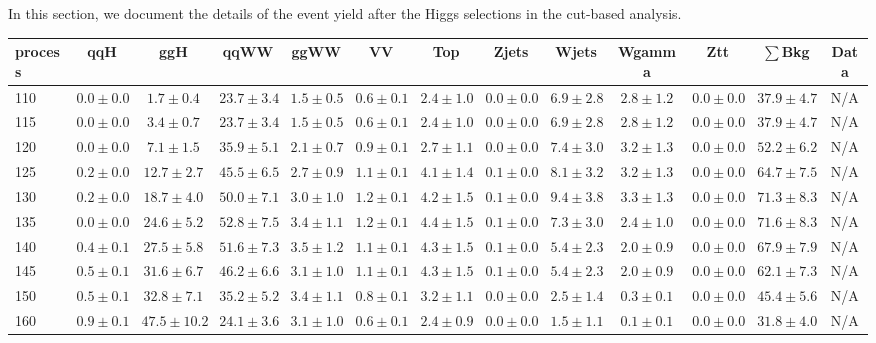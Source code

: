 In this section, we document the details of the event yield after the Higgs 
selections in the cut-based analysis.

\begin{table}
{%
 \tiny
 \begin{center}
 \begin{tabular}{l | c c | c c c c c c c c  | c c}
 \hline
 process & qqH & ggH & qqWW & ggWW & VV & Top & Zjets & Wjets & Wgamma & Ztt & $\sum$Bkg & Data \\
 \hline
110 & $0.0\pm0.0$ & $1.7\pm0.4$ & $23.7\pm3.4$ & $1.5\pm0.5$ & $0.6\pm0.1$ & $2.4\pm1.0$ & $0.0\pm0.0$ & $6.9\pm2.8$ & $2.8\pm1.2$ & $0.0\pm0.0$ & $37.9\pm4.7$ & N/A \\
115 & $0.0\pm0.0$ & $3.4\pm0.7$ & $23.7\pm3.4$ & $1.5\pm0.5$ & $0.6\pm0.1$ & $2.4\pm1.0$ & $0.0\pm0.0$ & $6.9\pm2.8$ & $2.8\pm1.2$ & $0.0\pm0.0$ & $37.9\pm4.7$ & N/A \\
120 & $0.0\pm0.0$ & $7.1\pm1.5$ & $35.9\pm5.1$ & $2.1\pm0.7$ & $0.9\pm0.1$ & $2.7\pm1.1$ & $0.0\pm0.0$ & $7.4\pm3.0$ & $3.2\pm1.3$ & $0.0\pm0.0$ & $52.2\pm6.2$ & N/A \\
125 & $0.2\pm0.0$ & $12.7\pm2.7$ & $45.5\pm6.5$ & $2.7\pm0.9$ & $1.1\pm0.1$ & $4.1\pm1.4$ & $0.1\pm0.0$ & $8.1\pm3.2$ & $3.2\pm1.3$ & $0.0\pm0.0$ & $64.7\pm7.5$ & N/A \\
130 & $0.2\pm0.0$ & $18.7\pm4.0$ & $50.0\pm7.1$ & $3.0\pm1.0$ & $1.2\pm0.1$ & $4.2\pm1.5$ & $0.1\pm0.0$ & $9.4\pm3.8$ & $3.3\pm1.3$ & $0.0\pm0.0$ & $71.3\pm8.3$ & N/A \\
135 & $0.0\pm0.0$ & $24.6\pm5.2$ & $52.8\pm7.5$ & $3.4\pm1.1$ & $1.2\pm0.1$ & $4.4\pm1.5$ & $0.1\pm0.0$ & $7.3\pm3.0$ & $2.4\pm1.0$ & $0.0\pm0.0$ & $71.6\pm8.3$ & N/A \\
140 & $0.4\pm0.1$ & $27.5\pm5.8$ & $51.6\pm7.3$ & $3.5\pm1.2$ & $1.1\pm0.1$ & $4.3\pm1.5$ & $0.1\pm0.0$ & $5.4\pm2.3$ & $2.0\pm0.9$ & $0.0\pm0.0$ & $67.9\pm7.9$ & N/A \\
145 & $0.5\pm0.1$ & $31.6\pm6.7$ & $46.2\pm6.6$ & $3.1\pm1.0$ & $1.1\pm0.1$ & $4.3\pm1.5$ & $0.1\pm0.0$ & $5.4\pm2.3$ & $2.0\pm0.9$ & $0.0\pm0.0$ & $62.1\pm7.3$ & N/A \\
150 & $0.5\pm0.1$ & $32.8\pm7.1$ & $35.2\pm5.2$ & $3.4\pm1.1$ & $0.8\pm0.1$ & $3.2\pm1.1$ & $0.0\pm0.0$ & $2.5\pm1.4$ & $0.3\pm0.1$ & $0.0\pm0.0$ & $45.4\pm5.6$ & N/A \\
160 & $0.9\pm0.1$ & $47.5\pm10.2$ & $24.1\pm3.6$ & $3.1\pm1.0$ & $0.6\pm0.1$ & $2.4\pm0.9$ & $0.0\pm0.0$ & $1.5\pm1.1$ & $0.1\pm0.1$ & $0.0\pm0.0$ & $31.8\pm4.0$ & N/A \\

\end{tabular}
\end{center}}
\end{table}
